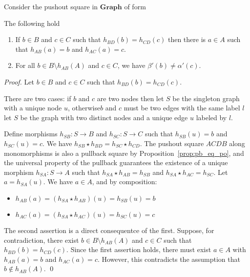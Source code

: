\begin{lemma}
    \label{lem:b_c_same_img_exist_a}
    Consider the pushout square in $\mathbf{Graph}$ of form
    \begin{center}{\normalfont
    }\end{center} 
    The following hold 
    \begin{enumerate}
        \item  If $ b\in B $ and $ c \in C $ such that $ h_{BD}(b) = h_{CD}(c) $ then there is $ a \in A $ such that $ h_{AB}(a) = b $ and $ h_{AC}(a)= c $.
        \item  For all \( b \in B \setminus h_{AB}(A) \) and \( c \in C \), we have \( \beta'(b) \neq \alpha'(c) \).
    \end{enumerate}
\end{lemma}
\begin{proof}
     Let \( b \in B \) and \( c \in C \) such that \( h_{BD}(b) = h_{CD}(c) \). 
     
     There are two cases: if $b$ and $c$ are two nodes then let \( S \) be the singleton graph with a unique node \( u \), otherwise\textemdash$b$ and $c$ must be two edges with the same label $l$\textemdash let \( S \) be the graph with two distinct nodes and a unique edge \( u \) labeled by $l$.
     
     Define morphisms \( h_{SB}: S \to B \) and \( h_{SC}: S \to C \) such that \( h_{SB}(u) = b \) and \( h_{SC}(u) = c \). We have \( h_{SB} \star h_{BD} = h_{SC} \star h_{CD} \). The pushout square \( ACDB \) along monomorphisms is also a pullback square by Proposition~\ref{prop:pb_eq_po}, and the universal property of the pullback guarantees the existence of a unique morphism \( h_{SA}: S \to A \) such that \( h_{SA} \star h_{AB} = h_{SB} \) and \( h_{SA} \star h_{AC} = h_{SC} \). Let \( a = h_{SA}(u) \). We have \( a \in A \), and by composition: 
     \begin{itemize}
        \item \(h_{AB}(a) = (h_{SA} \star h_{AB})(u) = h_{SB}(u) = b \)
        \item \(h_{AC}(a) = (h_{SA} \star h_{AC})(u) = h_{SC}(u) = c\)
     \end{itemize} 

    The second assertion is a direct consequentce of the first. Suppose, for contradiction, there exist \( b \in B \setminus h_{AB}(A) \) and \( c \in C \) such that \( h_{BD}(b) = h_{CD}(c) \). Since the first assertion holds, there must exist \( a \in A \) with \( h_{AB}(a) = b \) and \( h_{AC}(a) = c \). However, this contradicts the assumption that \( b \notin h_{AB}(A) \).
    \qed
\end{proof}

